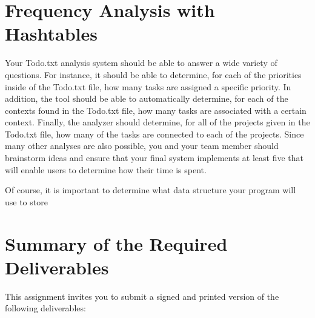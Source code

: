 \section*{Frequency Analysis with Hashtables}

  Your Todo.txt analysis system should be able to answer a wide variety of questions. For instance, it should be able to
  determine, for each of the priorities inside of the Todo.txt file, how many tasks are assigned a specific priority.
  In addition, the tool should be able to automatically determine, for each of the contexts found in the Todo.txt file,
  how many tasks are associated with a certain context. Finally, the analyzer should determine, for all of the projects
  given in the Todo.txt file, how many of the tasks are connected to each of the projects. Since many other analyses are
  also possible, you and your team member should brainstorm ideas and ensure that your final system implements at least
  five that will enable users to determine how their time is spent.

  Of course, it is important to determine what data structure your program will use to store



\section*{Summary of the Required Deliverables}

  This assignment invites you to submit a signed and printed version of the following deliverables: 

